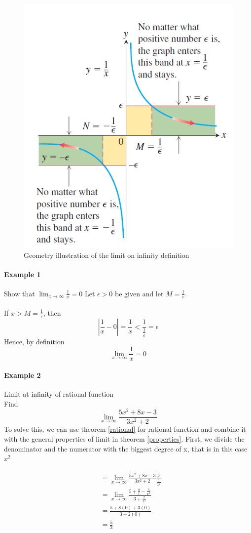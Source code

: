 \documentclass[12pt]{article}
\begin{document}
\begin{figure}[h!]
    \centering
    \includegraphics[width = 0.4\linewidth]{Images/infty limit 4.png}
    \caption{Geometry illustration of the limit on infinity definition}
\end{figure}
\paragraph{Example 1} Show that $\lim_{x \to \infty} \frac{1}{x} = 0$
Let $\epsilon > 0 $ be given and let $M = \frac{1}{\epsilon}$. \\ \\
If $x > M = \frac{1}{\epsilon}$, then
\[
    \left|  \frac{1}{x} - 0 \right|  = \frac{1}{x} < \frac{1}{\frac{1}{\epsilon}} = \epsilon
\]
Hence, by definition 
\[
    \lim_{x \to \infty} \frac{1}{x} = 0
\]

\paragraph{Example 2} Limit at infinity of rational function \\
Find 
\[
    \lim_{x \to \infty} \frac{5x^2 + 8x - 3}{3x^2 + 2}
\]
To solve this, we can use theorem \ref{rational} for rational function and combine it with the 
general properties of limit in theorem \ref{properties}. First, we divide the denominator and the numerator
with the biggest degree of x, that is in this case $x^2$

\begin{align*} 
   & = \lim_{x \to \infty} \frac{5x^2 + 8x - 3}{3x^2 + 2} \frac{\frac{1}{x^2}}{\frac{1}{x^2}} \\
   & = \lim_{x \to \infty} \frac{5 + \frac{8}{x} - \frac{3}{x^2}}{3 + \frac{2}{x^2}} \\
   & = \frac{5 + 8(0) + 3(0)}{3 + 2(0)} \\
   & = \frac{5}{3} 
\end{align*}
\end{document}
